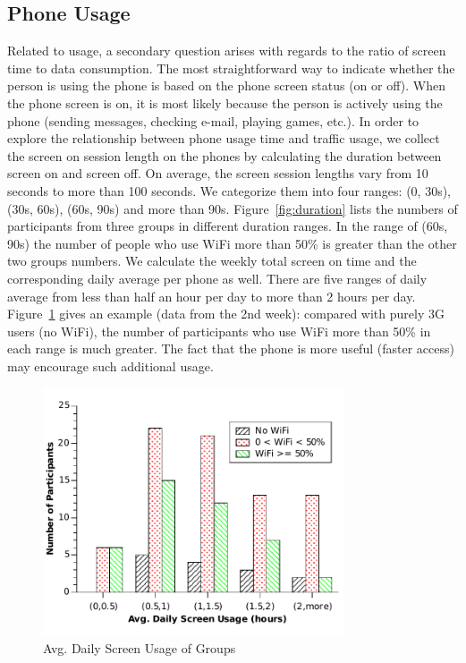 \subsection{Phone Usage}
Related to usage, a secondary question arises with regards to the ratio of screen time to data consumption.  The most straightforward way to indicate whether the person is using the phone is based on the phone screen status (on or off). When the phone screen is on, it is most likely because the person is actively using the phone (sending messages, checking e-mail, playing games, etc.). In order to explore the relationship between phone usage time and traffic usage, we collect the screen on session length on the phones by calculating the duration between screen on and screen off. On average, the screen session lengths vary from 10 seconds to more than 100 seconds. We categorize them into four ranges: (0, 30s), (30s, 60s), (60s, 90s) and more than 90s. Figure~\ref{fig:duration} lists the numbers of participants from three groups in different duration ranges. In the range of (60s, 90s) the number of people who use WiFi more than 50\% is greater than the other two groups numbers. We calculate the weekly total screen on time and the corresponding daily average per phone as well. There are five ranges of daily average from less than half an hour per day to more than 2 hours per day. Figure~\ref{fig:screen} gives an example (data from the 2nd week): compared with purely 3G users (no WiFi), the number of participants who use WiFi more than 50\% in each range is much greater.  The fact that the phone is more useful (faster access) may encourage such additional usage. 

\begin{figure}[h!tbp]
\centering
\includegraphics[width = 3.5in]{graphs/screen2.pdf}
\caption{Avg. Daily Screen Usage of Groups} 
\label{fig:screen}
\end{figure}

